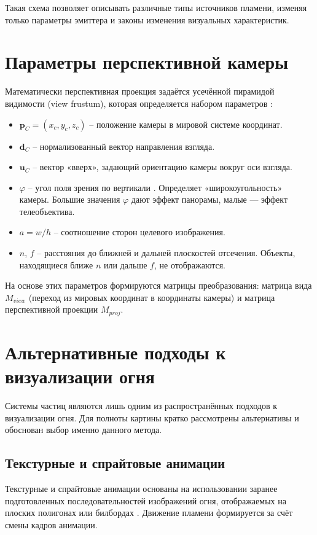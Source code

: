 Такая схема позволяет описывать различные типы источников пламени, изменяя только параметры эмиттера и законы изменения визуальных характеристик.

\section{Параметры перспективной камеры}

Математически перспективная проекция задаётся усечённой пирамидой видимости (view frustum), которая определяется набором параметров \cite{DemCG}:
\begin{itemize}
	\item $\mathbf{p}_C = (x_c, y_c, z_c)$ -- положение камеры в мировой системе координат.
	\item $\mathbf{d}_C$ -- нормализованный вектор направления взгляда.
	\item $\mathbf{u}_C$ -- вектор «вверх», задающий ориентацию камеры вокруг оси взгляда.
	\item $\varphi$ -- угол поля зрения по вертикали . Определяет «широкоугольность» камеры. Большие значения $\varphi$ дают эффект панорамы, малые --- эффект телеобъектива.
	\item $a = w / h$ -- соотношение сторон целевого изображения.
	\item $n$, $f$ -- расстояния до ближней и дальней плоскостей отсечения. Объекты, находящиеся ближе $n$ или дальше $f$, не отображаются.
\end{itemize}

На основе этих параметров формируются матрицы преобразования: матрица вида $M_{view}$ (переход из мировых координат в координаты камеры) и матрица перспективной проекции $M_{proj}$.

\section{Альтернативные подходы к визуализации огня}

Системы частиц являются лишь одним из распространённых подходов к визуализации огня. Для полноты картины кратко рассмотрены альтернативы и обоснован выбор именно данного метода.

\subsection{Текстурные и спрайтовые анимации}

Текстурные и спрайтовые анимации основаны на использовании заранее подготовленных последовательностей изображений огня, отображаемых на плоских полигонах или билбордах \cite{FoleyVanDam}. Движение пламени формируется за счёт смены кадров анимации.

